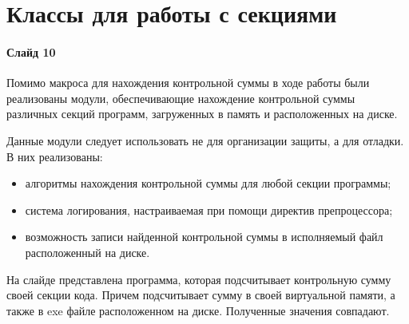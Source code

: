 
\section{Классы для работы с секциями}

\paragraph{Слайд 10}\mbox{}\par

Помимо макроса для нахождения контрольной суммы в ходе работы были реализованы
модули, обеспечивающие нахождение контрольной суммы различных секций программ,
загруженных в память и расположенных на диске.

Данные модули следует использовать не для организации защиты, а для отладки. В
них реализованы:
\begin{itemize}
  \item алгоритмы нахождения контрольной суммы для любой секции программы;
  \item система логирования, настраиваемая при помощи директив препроцессора;
  \item возможность записи найденной контрольной суммы в исполняемый файл
    расположенный на диске.
\end{itemize}

На слайде представлена программа, которая подсчитывает контрольную сумму своей
секции кода. Причем подсчитывает сумму в своей виртуальной памяти, а также в exe
файле расположенном на диске.  Полученные значения совпадают.
